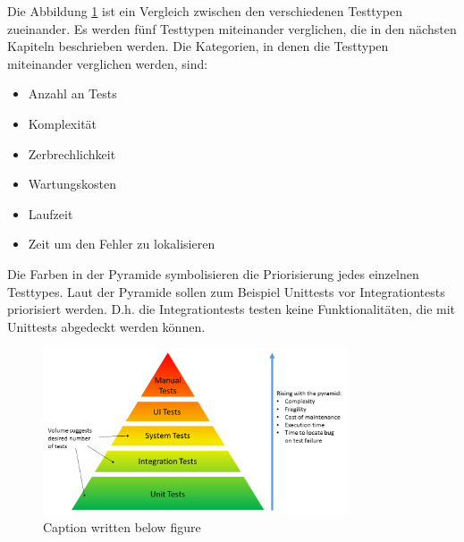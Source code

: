 Die Abbildung \ref{fig:TestingPyramide} ist ein Vergleich zwischen den verschiedenen Testtypen zueinander.
Es werden fünf Testtypen miteinander verglichen, die in den nächsten Kapiteln beschrieben werden. 
Die Kategorien, in denen die Testtypen miteinander verglichen werden, sind:
\begin{itemize}
    \item Anzahl an Tests
    \item Komplexität
    \item Zerbrechlichkeit
    \item Wartungskosten
    \item Laufzeit
    \item Zeit um den Fehler zu lokalisieren
\end{itemize} 
Die Farben in der Pyramide symbolisieren die Priorisierung jedes einzelnen Testtypes.
Laut der Pyramide sollen zum Beispiel Unittests vor Integrationtests priorisiert werden.
D.h. die Integrationtests testen keine Funktionalitäten, die mit Unittests abgedeckt werden können. 


\begin{figure}[H]
    \centering
    \includegraphics[width=0.8\textwidth]{Images/test_pyramid.png}
    \caption[Testing Pyramide]{Caption written below figure \footnotemark}
    \label{fig:TestingPyramide}
\end{figure}
